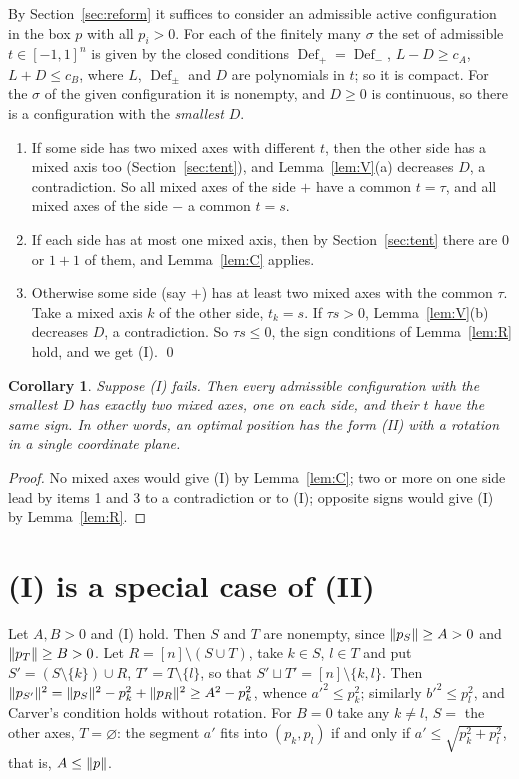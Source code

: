 \documentclass[11pt]{article}
\newtheorem{corollary}[theorem]{Corollary}
\theoremstyle{definition}
\theoremstyle{remark}
\newcommand{\Def}{\operatorname{Def}}
\DeclarePairedDelimiter{\norm}{\lVert}{\rVert}
\begin{document}
By Section~\ref{sec:reform} it suffices to consider an admissible active configuration in the box $p$ with all
$p_i>0$. For each of the finitely many $\sigma$ the set of admissible $t\in[-1,1]^n$ is given by the closed
conditions $\Def_+=\Def_-$, $L-D\ge c_A$, $L+D\le c_B$, where $L$, $\Def_\pm$ and $D$ are polynomials in $t$;
so it is compact. For the $\sigma$ of the given configuration it is nonempty, and $D\ge0$ is continuous, so there is a configuration with the
\emph{smallest} $D$.
\begin{enumerate}
\item If some side has two mixed axes with different $t$, then the other side has a mixed axis too
(Section~\ref{sec:tent}), and Lemma~\ref{lem:V}(a) decreases $D$, a contradiction. So all mixed axes of the
side $+$ have a common $t=\tau$, and all mixed axes of the side $-$ a common $t=s$.
\item If each side has at most one mixed axis, then by Section~\ref{sec:tent} there are $0$ or $1+1$ of them,
and Lemma~\ref{lem:C} applies.
\item Otherwise some side (say $+$) has at least two mixed axes with the common $\tau$. Take a mixed axis $k$ of
the other side, $t_k=s$. If $\tau s>0$, Lemma~\ref{lem:V}(b) decreases $D$, a contradiction. So $\tau s\le0$,
the sign conditions of Lemma~\ref{lem:R} hold, and we get (I). \qed
\end{enumerate}

\begin{corollary}\label{cor:structure}
Suppose (I) fails. Then every admissible configuration with the smallest $D$ has exactly two mixed axes, one on each
side, and their $t$ have the same sign. In other words, an optimal position has the form (II) with a rotation in a
single coordinate plane.
\end{corollary}
\begin{proof}
No mixed axes would give (I) by Lemma~\ref{lem:C}; two or more on one side lead by items 1 and 3 to a contradiction
or to (I); opposite signs would give (I) by Lemma~\ref{lem:R}.
\end{proof}

\section{(I) is a special case of (II)}\label{sec:I}

Let $A,B>0$ and (I) hold. Then $S$ and $T$ are nonempty, since $\norm{p_S}\ge A>0$ and $\norm{p_T}\ge B>0$.
Let $R=[n]\setminus(S\cup T)$, take $k\in S$, $l\in T$ and put $S'=(S\setminus\{k\})\cup R$, $T'=T\setminus\{l\}$,
so that $S'\sqcup T'=[n]\setminus\{k,l\}$. Then $\norm{p_{S'}}^2=\norm{p_S}^2-p_k^2+\norm{p_R}^2\ge A^2-p_k^2$,
whence $a'^2\le p_k^2$; similarly $b'^2\le p_l^2$, and Carver's condition holds without rotation. For $B=0$ take any
$k\ne l$, $S=$ the other axes, $T=\varnothing$: the segment $a'$ fits into $(p_k,p_l)$ if and only if
$a'\le\sqrt{p_k^2+p_l^2}$, that is, $A\le\norm p$.
\end{document}
